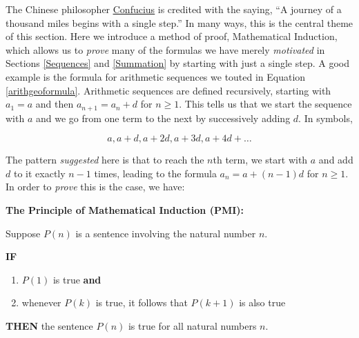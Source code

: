 \documentclass{ximera}
\begin{document}
	\author{Stitz-Zeager}




\setcounter{footnote}{0}

\label{Induction}

The Chinese philosopher \href{http://en.wikipedia.org/wiki/Confucius}{\underline{Confucius}} is credited with the saying, ``A journey of a thousand miles begins with a single step.''  In many ways, this is the central theme of this section.  Here we introduce a method of proof, Mathematical Induction, which allows us to \textit{prove} many of the formulas we have merely \textit{motivated} in Sections \ref{Sequences} and \ref{Summation} by starting with just a single step.  A good example is the formula for arithmetic sequences we touted in Equation \ref{arithgeoformula}.  Arithmetic sequences are defined recursively, starting with $a_{1} = a$ and then $a_{n+1} = a_{n} + d$ for $n \geq 1$.  This tells us that we start the sequence with  $a$ and we go from one term to the next by successively adding $d$.  In symbols,

\[ a, a+d, a+2d, a + 3d, a + 4d +  \ldots\]

The pattern \textit{suggested} here is  that to reach the $n$th term, we start with $a$ and add $d$ to it exactly $n-1$ times, leading to the formula $a_{n} = a + (n-1)d$ for $n \geq 1$.  In order to  \textit{prove} this is the case, we have:

 


\label{PMI} \textbf{The Principle of Mathematical Induction (PMI):}  

Suppose $P(n)$ is a sentence involving the natural number $n$. 

 

\textbf{IF}

\begin{enumerate}

\item  $P(1)$ is true \textbf{and}

\item  whenever $P(k)$ is true, it follows that $P(k+1)$ is also true

\end{enumerate}

\textbf{THEN} the sentence $P(n)$ is true for all natural numbers $n$.
\end{document}

